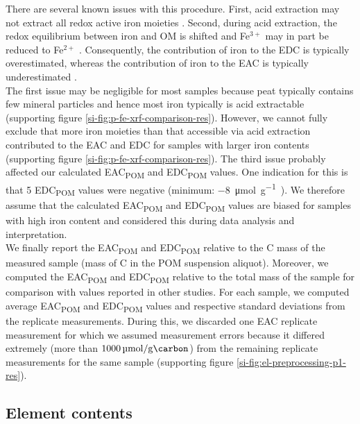 \documentclass[draft,linenumbers]{agujournal2018}
\begin{document}
There are several known issues with this procedure. First, acid
extraction may not extract all redox active iron moieties
\citep{Lau.2016}. Second, during acid extraction, the redox equilibrium
between iron and OM is shifted and Fe\(^{3+}\) may in part be reduced to
Fe\(^{2+}\) \citep{Lau.2015}. Consequently, the contribution of iron to
the EDC is typically overestimated, whereas the contribution of iron to
the EAC is typically underestimated \citep{Lau.2015}.\\
The first issue may be negligible for most samples because peat
typically contains few mineral particles and hence most iron typically
is acid extractable (supporting figure
\ref{si-fig:p-fe-xrf-comparison-res}). However, we cannot fully exclude
that more iron moieties than that accessible via acid extraction
contributed to the EAC and EDC for samples with larger iron contents
(supporting figure \ref{si-fig:p-fe-xrf-comparison-res}). The third
issue probably affected our calculated EAC\textsubscript{POM} and
EDC\textsubscript{POM} values. One indication for this is that 5
EDC\textsubscript{POM} values were negative (minimum:
\SI{-8}{\micro\mol\per\gram\carbon}). We therefore assume that the
calculated EAC\textsubscript{POM} and EDC\textsubscript{POM} values are
biased for samples with high iron content and considered this during
data analysis and interpretation.\\
We finally report the EAC\textsubscript{POM} and EDC\textsubscript{POM}
relative to the C mass of the measured sample (mass of C in the POM
suspension aliquot). Moreover, we computed the EAC\textsubscript{POM}
and EDC\textsubscript{POM} relative to the total mass of the sample for
comparison with values reported in other studies. For each sample, we
computed average EAC\textsubscript{POM} and EDC\textsubscript{POM}
values and respective standard deviations from the replicate
measurements. During this, we discarded one EAC replicate measurement
for which we assumed measurement errors because it differed extremely
(more than \(\SI{1000}{\micro\mol\per\gram\carbon}\)) from the remaining
replicate measurements for the same sample (supporting figure
\ref{si-fig:el-preprocessing-p1-res}).

\subsection{Element contents}
\end{document}
